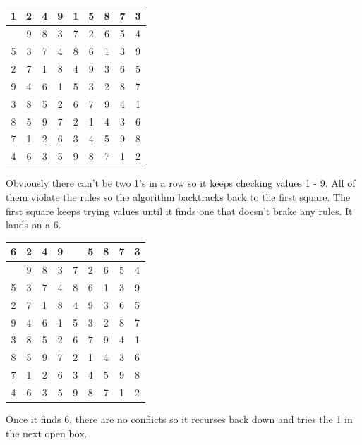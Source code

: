 \documentclass{sig-alternate}
\begin{document}
\begin{center}
  \begin{tabular}{ | c | c | c | c | c | c | c | c | c |}
    \hline
      \textbf{1} & 2 & 4 & 9 &  \textbf{1} & 5 & 8 & 7 & 3 \\ \hline
	  & 9 & 8 & 3 & 7 & 2 & 6 & 5 & 4 \\ \hline
	 5 & 3 & 7 & 4 & 8 & 6 & 1 & 3 & 9\\ \hline
	 2 & 7 & 1 & 8 & 4 & 9 & 3 & 6 & 5\\ \hline
	 9 & 4 & 6 & 1 & 5 & 3 & 2 & 8 & 7\\ \hline
	 3 & 8 & 5 & 2 & 6 & 7 & 9 & 4 & 1\\ \hline
     8 & 5 & 9 & 7 & 2 & 1 & 4 & 3 & 6\\ \hline
	 7 & 1 & 2 & 6 & 3 & 4 & 5 & 9 & 8\\ \hline
	 4 & 6 & 3 & 5 & 9 & 8 & 7 & 1 & 2\\ \hline
  \end{tabular}
\end{center}

Obviously there can't be two 1's in a row so it keeps checking values 1 - 9. All of them violate the rules so the algorithm backtracks back to the first square. The first square keeps trying values until it finds one that doesn't brake any rules. It lands on a 6. 

\begin{center}
  \begin{tabular}{ | c | c | c | c | c | c | c | c | c |}
    \hline
      \textbf{6} & 2 & 4 & 9 &  & 5 & 8 & 7 & 3 \\ \hline
	  & 9 & 8 & 3 & 7 & 2 & 6 & 5 & 4 \\ \hline
	 5 & 3 & 7 & 4 & 8 & 6 & 1 & 3 & 9\\ \hline
	 2 & 7 & 1 & 8 & 4 & 9 & 3 & 6 & 5\\ \hline
	 9 & 4 & 6 & 1 & 5 & 3 & 2 & 8 & 7\\ \hline
	 3 & 8 & 5 & 2 & 6 & 7 & 9 & 4 & 1\\ \hline
     8 & 5 & 9 & 7 & 2 & 1 & 4 & 3 & 6\\ \hline
	 7 & 1 & 2 & 6 & 3 & 4 & 5 & 9 & 8\\ \hline
	 4 & 6 & 3 & 5 & 9 & 8 & 7 & 1 & 2\\ \hline
  \end{tabular}
\end{center}

Once it finds 6, there are no conflicts so it recurses back down and tries the 1 in the next open box.
\end{document}
